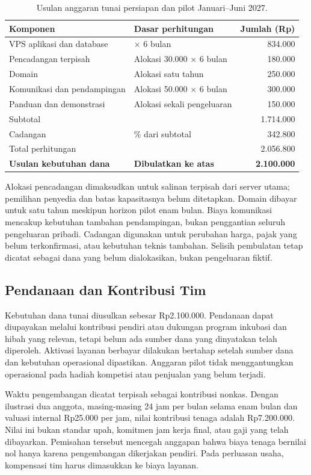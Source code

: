 \documentclass[12pt,a4paper,oneside]{report}
\begin{document}
\begin{table}[!htbp]
\centering
\singlespacing
\caption{Usulan anggaran tunai persiapan dan pilot Januari--Juni 2027.}
\label{tab:anggaran}
\begin{tabularx}{\textwidth}{@{}>{\raggedright\arraybackslash}X >{\raggedright\arraybackslash}p{4.5cm} r@{}}
\toprule
\textbf{Komponen} & \textbf{Dasar perhitungan} & \textbf{Jumlah (Rp)} \tabularnewline
\midrule
VPS aplikasi dan database & 139.000 $\times$ 6 bulan & 834.000 \tabularnewline
Pencadangan terpisah & Alokasi 30.000 $\times$ 6 bulan & 180.000 \tabularnewline
Domain & Alokasi satu tahun & 250.000 \tabularnewline
Komunikasi dan pendampingan & Alokasi 50.000 $\times$ 6 bulan & 300.000 \tabularnewline
Panduan dan demonstrasi & Alokasi sekali pengeluaran & 150.000 \tabularnewline
\midrule
Subtotal & & 1.714.000 \tabularnewline
Cadangan & 20\% dari subtotal & 342.800 \tabularnewline
Total perhitungan & & 2.056.800 \tabularnewline
\textbf{Usulan kebutuhan dana} & \textbf{Dibulatkan ke atas} & \textbf{2.100.000} \tabularnewline
\bottomrule
\end{tabularx}
\end{table}
\FloatBarrier

Alokasi pencadangan dimaksudkan untuk salinan terpisah dari server utama; pemilihan penyedia dan batas kapasitasnya belum ditetapkan. Domain dibayar untuk satu tahun meskipun horizon pilot enam bulan. Biaya komunikasi mencakup kebutuhan tambahan pendampingan, bukan penggantian seluruh pengeluaran pribadi. Cadangan digunakan untuk perubahan harga, pajak yang belum terkonfirmasi, atau kebutuhan teknis tambahan. Selisih pembulatan tetap dicatat sebagai dana yang belum dialokasikan, bukan pengeluaran fiktif.

\subsection{Pendanaan dan Kontribusi Tim}
Kebutuhan dana tunai diusulkan sebesar Rp2.100.000. Pendanaan dapat diupayakan melalui kontribusi pendiri atau dukungan program inkubasi dan hibah yang relevan, tetapi belum ada sumber dana yang dinyatakan telah diperoleh. Aktivasi layanan berbayar dilakukan bertahap setelah sumber dana dan kebutuhan operasional dipastikan. Anggaran pilot tidak menggantungkan operasional pada hadiah kompetisi atau penjualan yang belum terjadi.

Waktu pengembangan dicatat terpisah sebagai kontribusi nonkas. Dengan ilustrasi dua anggota, masing-masing 24 jam per bulan selama enam bulan dan valuasi internal Rp25.000 per jam, nilai kontribusi tenaga adalah Rp7.200.000. Nilai ini bukan standar upah, komitmen jam kerja final, atau gaji yang telah dibayarkan. Pemisahan tersebut mencegah anggapan bahwa biaya tenaga bernilai nol hanya karena pengembangan dikerjakan pendiri. Pada perluasan usaha, kompensasi tim harus dimasukkan ke biaya layanan.
\end{document}

